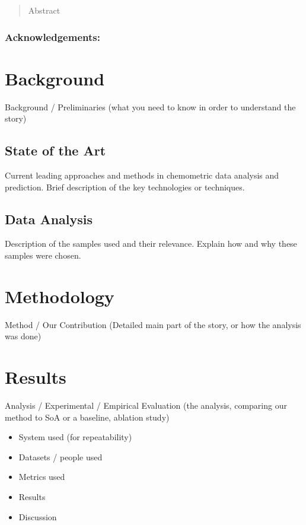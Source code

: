 
\newpage

\begin{abstract}
Abstract
\end{abstract}

\maketitle

\subsubsection*{Acknowledgements:}




\section{Background}
Background / Preliminaries (what you need to know in order to understand the story)
\subsection{State of the Art}
Current leading approaches and methods in chemometric data analysis and prediction.
Brief description of the key technologies or techniques.



\subsection{Data Analysis}
Description of the samples used and their relevance.
Explain how and why these samples were chosen.

\section{Methodology}
Method / Our Contribution (Detailed main part of the story, or how the analysis was done)

\section{Results}
Analysis / Experimental / Empirical Evaluation (the analysis, comparing our method to SoA or a baseline, ablation study)
\begin{itemize}
    \item System used (for repeatability)
    \item Datasets / people used
    \item Metrics used
    \item Results
    \item Discussion
\end{itemize}

